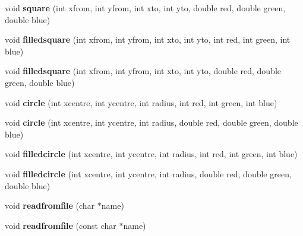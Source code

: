 \begin{DoxyCompactItemize}
\item 
\hypertarget{classpngwriter_ac1c8dbcaaad9954f988dedffa504d376}{}void {\bfseries square} (int xfrom, int yfrom, int xto, int yto, double red, double green, double blue)\label{classpngwriter_ac1c8dbcaaad9954f988dedffa504d376}

\item 
\hypertarget{classpngwriter_a255bd600a91f629a38180244d22d2af0}{}void {\bfseries filledsquare} (int xfrom, int yfrom, int xto, int yto, int red, int green, int blue)\label{classpngwriter_a255bd600a91f629a38180244d22d2af0}

\item 
\hypertarget{classpngwriter_aa51c7a169dab1c1dbbce426a2a3886ee}{}void {\bfseries filledsquare} (int xfrom, int yfrom, int xto, int yto, double red, double green, double blue)\label{classpngwriter_aa51c7a169dab1c1dbbce426a2a3886ee}

\item 
\hypertarget{classpngwriter_ab04aca49364ae382d0bf691bddc0c1af}{}void {\bfseries circle} (int xcentre, int ycentre, int radius, int red, int green, int blue)\label{classpngwriter_ab04aca49364ae382d0bf691bddc0c1af}

\item 
\hypertarget{classpngwriter_a39841632d31dce4e4a8b942a1c562543}{}void {\bfseries circle} (int xcentre, int ycentre, int radius, double red, double green, double blue)\label{classpngwriter_a39841632d31dce4e4a8b942a1c562543}

\item 
\hypertarget{classpngwriter_af2b4b2e8c6a2948203f22233d216b83c}{}void {\bfseries filledcircle} (int xcentre, int ycentre, int radius, int red, int green, int blue)\label{classpngwriter_af2b4b2e8c6a2948203f22233d216b83c}

\item 
\hypertarget{classpngwriter_afb3710bad2d95eee5f21378090438804}{}void {\bfseries filledcircle} (int xcentre, int ycentre, int radius, double red, double green, double blue)\label{classpngwriter_afb3710bad2d95eee5f21378090438804}

\item 
\hypertarget{classpngwriter_a44b6b289feb34dd82927f917cb7100ec}{}void {\bfseries readfromfile} (char $\ast$name)\label{classpngwriter_a44b6b289feb34dd82927f917cb7100ec}

\item 
\hypertarget{classpngwriter_a04531f2087f9fac0a4163ca6306752c7}{}void {\bfseries readfromfile} (const char $\ast$name)\label{classpngwriter_a04531f2087f9fac0a4163ca6306752c7}


\end{DoxyCompactItemize}
